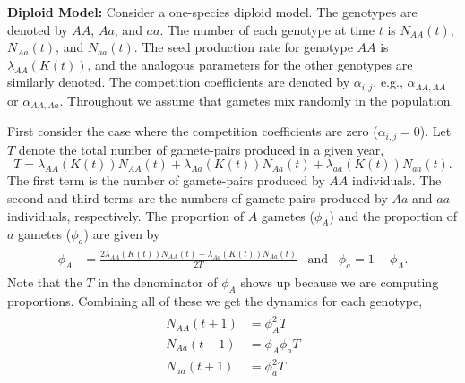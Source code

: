 \documentclass[11pt]{article}
\begin{document}

\noindent \textbf{Diploid Model:} Consider a one-species diploid model.  The genotypes are denoted by $AA$, $Aa$, and $aa$. The number of each genotype at time $t$ is $N_{AA}(t)$, $N_{Aa}(t)$, and $N_{aa}(t)$.  
The seed production rate for genotype $AA$ is $\lambda_{AA}(K(t))$, and the analogous parameters for the other genotypes are similarly denoted.  The competition coefficients are denoted by $\alpha_{i,j}$, e.g., $\alpha_{AA,AA}$ or $\alpha_{AA,Aa}$.  Throughout we assume that gametes mix randomly in the population.  

First consider the case where the competition coefficients are zero ($\alpha_{i,j}=0$).  Let $T$ denote the total number of gamete-pairs produced in a given year,
\begin{equation}
T = \lambda_{AA}(K(t))N_{AA}(t) + \lambda_{Aa}(K(t))N_{Aa}(t) +\lambda_{aa}(K(t))N_{aa}(t).
\end{equation}
The first term is the number of gamete-pairs produced by $AA$ individuals.  The second and third terms are the numbers of gamete-pairs produced by $Aa$ and $aa$ individuals, respectively. The proportion of $A$ gametes ($\phi_A$) and the proportion of $a$ gametes ($\phi_a$) are given by
\begin{align}\begin{split}
\phi_{A} &= \frac{2\lambda_{AA}(K(t))N_{AA}(t)+ \lambda_{Aa}(K(t))N_{Aa}(t)}{2T} \hspace{10pt} \text{and} \hspace{10pt} \phi_a = 1-\phi_{A}.
\end{split}\end{align}
Note that the $T$ in the denominator of $\phi_A$ shows up because we are computing proportions.  Combining all of these we get the dynamics for each genotype,
\begin{align}\begin{split}
N_{AA}(t+1) &= \phi_A^2T\\
N_{Aa}(t+1) &= \phi_A\phi_aT\\
N_{aa}(t+1) &= \phi_a^2T
\end{split}\end{align}
\end{document}
